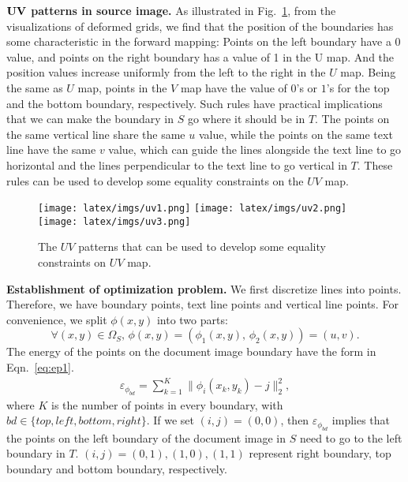 \documentclass[10pt,twocolumn,letterpaper]{article}
\newcommand{\myparagraph}[1]{\vspace{1pt} \noindent \textbf{#1} }
\begin{document}
\myparagraph{$\bf UV$ patterns in source image.} As illustrated in Fig.~\ref{fig:uv}, from the visualizations of deformed grids, we find that the position of the boundaries has some characteristic in the forward mapping: Points on the left boundary have a $0$ value, and points on the right boundary has a value of 1 in the U map. And the position values increase uniformly from the left to the right in the $U$ map. Being the same as $U$ map, points in the 
$V$ map have the value of $0$'s or $1$'s for the top and the bottom boundary, respectively. Such rules have practical implications that we can make the boundary in $S$ go where it should be in $T$.
The points on the same vertical line share the same $u$ value, while the points on the same text line have the same $v$ value, which can guide the lines alongside the text line to go horizontal and the lines perpendicular to the text line to go vertical in $T$.
These rules can be used to develop some equality constraints on the $UV$ map.



\begin{figure}[!t]
  \centering
  \vspace{-2mm}
  \texttt{[image: latex/imgs/uv1.png]}
  \texttt{[image: latex/imgs/uv2.png]}
  \texttt{[image: latex/imgs/uv3.png]}
 \vspace{-2mm}
   \caption{The $UV$ patterns that can be used to develop some equality constraints on $UV$ map.}
   \label{fig:uv}
  \vspace{1em}
\end{figure}


\myparagraph{Establishment of optimization problem.} We first discretize lines into points. Therefore, we have boundary points, text line points and vertical line points. For convenience, we split $\phi(x,y)$ into two parts:
$$
  \forall (x,y) \in \Omega_S, \, \phi(x,y) = \left(\phi_{1}(x,y), \,\phi_{2}(x,y) \right) = (u,v).
  \label{eq:phi}
$$
The energy of the points on the document image boundary have the form in Eqn.~\eqref{eq:ep1}. 
\vspace{-0.5em}
\begin{align}
  \varepsilon_{\phi_{bd}}= \sum_{k=1}^{K} \lVert \phi_{i}(x_{k},y_{k})-j\rVert_{2}^{2},
  \label{eq:ep1}
\end{align}
where $K$ is the number of points in every boundary, with $bd \in \{top, left, bottom, right\}$. 
If we set $(i,j) = (0,0)$, then $\varepsilon_{\phi_{bd}}$ implies that the points on the left boundary of the document image in $S$ need to go to the left boundary in $T$. $(i,j) = (0,1),(1,0),(1,1)$ represent right boundary, top boundary and bottom boundary, respectively.
\end{document}
